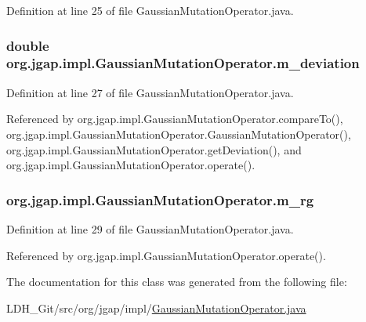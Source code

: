 Definition at line 25 of file Gaussian\-Mutation\-Operator.\-java.

\hypertarget{classorg_1_1jgap_1_1impl_1_1_gaussian_mutation_operator_a4278e98a678979f59d6c0f9242d2da33}{
\subsubsection[{m\-\_\-deviation}]{\setlength{\rightskip}{0pt plus 5cm}double org.\-jgap.\-impl.\-Gaussian\-Mutation\-Operator.\-m\-\_\-deviation\hspace{0.3cm}{\ttfamily [private]}}}\label{classorg_1_1jgap_1_1impl_1_1_gaussian_mutation_operator_a4278e98a678979f59d6c0f9242d2da33}


Definition at line 27 of file Gaussian\-Mutation\-Operator.\-java.



Referenced by org.\-jgap.\-impl.\-Gaussian\-Mutation\-Operator.\-compare\-To(), org.\-jgap.\-impl.\-Gaussian\-Mutation\-Operator.\-Gaussian\-Mutation\-Operator(), org.\-jgap.\-impl.\-Gaussian\-Mutation\-Operator.\-get\-Deviation(), and org.\-jgap.\-impl.\-Gaussian\-Mutation\-Operator.\-operate().

\hypertarget{classorg_1_1jgap_1_1impl_1_1_gaussian_mutation_operator_a8f6f5c01260bae127da24ca8231ac158}{
\subsubsection[{m\-\_\-rg}]{ org.\-jgap.\-impl.\-Gaussian\-Mutation\-Operator.\-m\-\_\-rg\hspace{0.3cm}{\ttfamily [private]}}}\label{classorg_1_1jgap_1_1impl_1_1_gaussian_mutation_operator_a8f6f5c01260bae127da24ca8231ac158}


Definition at line 29 of file Gaussian\-Mutation\-Operator.\-java.



Referenced by org.\-jgap.\-impl.\-Gaussian\-Mutation\-Operator.\-operate().



The documentation for this class was generated from the following file\-:\begin{DoxyCompactItemize}
\item 
L\-D\-H\-\_\-\-Git/src/org/jgap/impl/\hyperlink{_gaussian_mutation_operator_8java}{Gaussian\-Mutation\-Operator.\-java}\end{DoxyCompactItemize}
